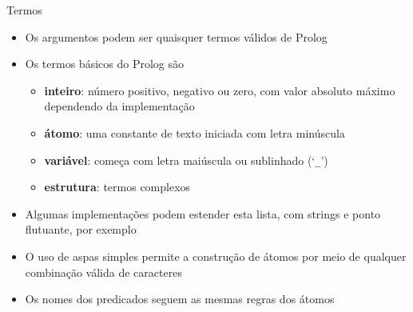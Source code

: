 \begin{frame}[fragile]{Termos}

    \begin{itemize}
        \item Os argumentos podem ser quaisquer termos válidos de Prolog

        \item Os termos básicos do Prolog são

        \begin{itemize}
            \item \textbf{inteiro}: número positivo, negativo ou zero, com valor absoluto 
                máximo dependendo da implementação

            \item \textbf{átomo}: uma constante de texto iniciada com letra minúscula

            \item \textbf{variável}: começa com letra maiúscula ou sublinhado (`\texttt{\_}')

            \item \textbf{estrutura}: termos complexos
        \end{itemize}

        \item Algumas implementações podem estender esta lista, com strings e ponto flutuante, 
            por exemplo

        \item O uso de aspas simples permite a construção de átomos por meio de qualquer 
            combinação válida de caracteres

        \item Os nomes dos predicados seguem as mesmas regras dos átomos
    \end{itemize}

\end{frame}

